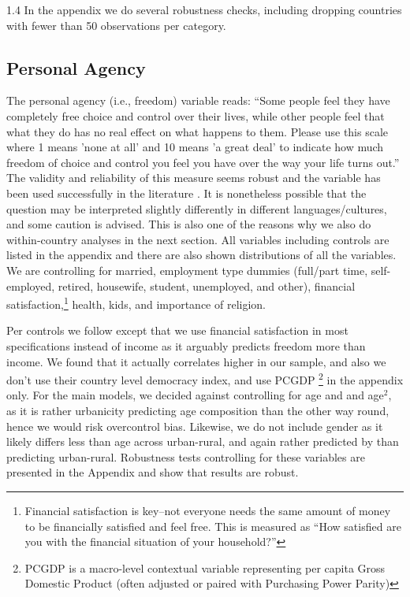 \documentclass[10pt, letterpaper]{article}
\begin{document}
\begin{spacing}{1.4}
In the appendix we do several robustness checks, including dropping countries with fewer than 50 observations per category.

\subsection{Personal Agency}

The personal agency (i.e., freedom) variable reads:
``Some people feel they have completely free choice and control over their lives, while other people feel that what they do has no real effect on what happens to them.  Please use this scale where 1 means
'none at all' and 10 means 'a great deal' to indicate how much freedom of choice and control you feel you have over the way your life turns out.'' 
The validity and reliability of this measure seems robust and the variable has been used successfully in the literature \citep[e.g.,][]{verme09,inglehart08,veenhoven00_b,aok_free_from_to}. It is nonetheless possible that the question may be interpreted slightly differently in different languages/cultures, and some caution is advised. This is also one of the reasons why we also do within-country analyses in the next section. 
All variables including controls are listed in the appendix and there are also shown distributions of all the variables. 
We are controlling for %
married, employment type dummies (full/part time, self-employed, retired, housewife, student, unemployed, and other),
financial satisfaction,\footnote{Financial satisfaction is key--not everyone needs the same amount of money to be financially satisfied and feel free. This is measured as ``How satisfied are you with the financial situation of your household?''} health, kids,
and importance of religion.

Per controls we follow \citet{pitlik2016free,nikolaev2016give} except that we use financial satisfaction in most specifications instead of income as it arguably predicts freedom more than income. We found that it actually correlates higher in our sample, and also
 we don't use their country level democracy index, and use PCGDP \footnote{PCGDP is a macro-level contextual variable representing per capita Gross Domestic Product (often adjusted or paired with Purchasing Power Parity)} in the appendix only. 
 For the main models, we decided against controlling for age and and age$^2$, as it is rather urbanicity predicting age composition than the other way round, hence we would risk overcontrol bias. Likewise, we do not include gender as it likely differs less than age across urban-rural, and again rather predicted by than predicting
 urban-rural. Robustness tests controlling for these variables are presented in the Appendix and show that results are robust.     


\end{spacing}
\end{document}
